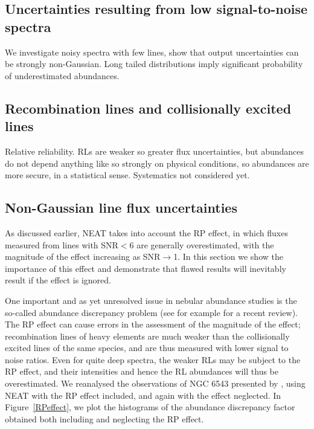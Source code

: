 \documentclass[useAMS,usenatbib]{mn2e}
\begin{document}


\subsection{Uncertainties resulting from low signal-to-noise spectra}

We investigate noisy spectra with few lines, show that output uncertainties can be strongly non-Gaussian.  Long tailed distributions imply significant probability of underestimated abundances.

\subsection{Recombination lines and collisionally excited lines}

Relative reliability.  RLs are weaker so greater flux uncertainties, but abundances do not depend anything like so strongly on physical conditions, so abundances are more secure, in a statistical sense.  Systematics not considered yet.

\subsection{Non-Gaussian line flux uncertainties}

As discussed earlier, NEAT takes into account the RP effect, in which fluxes measured from lines with SNR$<$6 are generally overestimated, with the magnitude of the effect increasing as SNR$\to$1.  In this section we show the importance of this effect and demonstrate that flawed results will inevitably result if the effect is ignored.

One important and as yet unresolved issue in nebular abundance studies is the so-called abundance discrepancy problem (see for example \citet{2006IAUS..234..219L} for a recent review).  The RP effect can cause errors in the assessment of the magnitude of the effect; recombination lines of heavy elements are much weaker than the collisionally excited lines of the same species, and are thus measured with lower signal to noise ratios.  Even for quite deep spectra, the weaker RLs may be subject to the RP effect, and their intensities and hence the RL abundances will thus be overestimated.  We reanalysed the observations of NGC 6543 presented by \citep{2004MNRAS.351.1026W}, using NEAT with the RP effect included, and again with the effect neglected.  In Figure~\ref{RPeffect}, we plot the histograms of the abundance discrepancy factor obtained both including and neglecting the RP effect.
\end{document}
